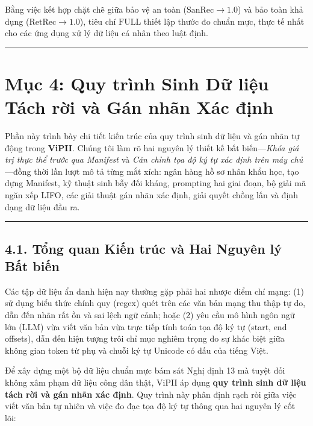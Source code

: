 \documentclass[
  11pt,
  a4paper,
]{article}
\begin{document}
Bằng việc kết hợp chặt chẽ giữa bảo vệ an toàn (\(\text{SanRec} \to 1.0\)) và bảo toàn khả dụng
(\(\text{RetRec} \to 1.0\)), tiêu chí \(\text{FULL}\) thiết lập thước đo chuẩn mực, thực tế nhất cho
các ứng dụng xử lý dữ liệu cá nhân theo luật định.

\begin{center}\rule{0.5\linewidth}{0.5pt}\end{center}

\section{Mục 4: Quy trình Sinh Dữ liệu Tách rời và Gán nhãn Xác
định}\label{mux1ee5c-4-quy-truxecnh-sinh-dux1eef-liux1ec7u-tuxe1ch-rux1eddi-vuxe0-guxe1n-nhuxe3n-xuxe1c-ux111ux1ecbnh}

Phần này trình bày chi tiết kiến trúc của quy trình sinh dữ liệu và gán nhãn tự động trong
\textbf{ViPII}. Chúng tôi làm rõ hai nguyên lý thiết kế bất biến---\emph{Khóa giá trị thực thể trước
qua Manifest} và \emph{Căn chỉnh tọa độ ký tự xác định trên máy chủ}---đồng thời lần lượt mô tả từng
mắt xích: ngân hàng hồ sơ nhân khẩu học, tạo dựng Manifest, kỹ thuật sinh bẫy đối kháng, prompting
hai giai đoạn, bộ giải mã ngăn xếp LIFO, các giải thuật gán nhãn xác định, giải quyết chồng lấn và
định dạng dữ liệu đầu ra.

\begin{center}\rule{0.5\linewidth}{0.5pt}\end{center}

\subsection{4.1. Tổng quan Kiến trúc và Hai Nguyên lý Bất
biến}\label{tux1ed5ng-quan-kiux1ebfn-truxfac-vuxe0-hai-nguyuxean-luxfd-bux1ea5t-biux1ebfn}

Các tập dữ liệu ẩn danh hiện nay thường gặp phải hai nhược điểm chí mạng: (1) sử dụng biểu thức
chính quy (regex) quét trên các văn bản mạng thu thập tự do, dẫn đến nhãn rất ồn và sai lệch ngữ
cảnh; hoặc (2) yêu cầu mô hình ngôn ngữ lớn (LLM) vừa viết văn bản vừa trực tiếp tính toán tọa độ ký
tự (start, end offsets), dẫn đến hiện tượng trôi chỉ mục nghiêm trọng do sự khác biệt giữa không
gian token từ phụ và chuỗi ký tự Unicode có dấu của tiếng Việt.

Để xây dựng một bộ dữ liệu chuẩn mực bám sát Nghị định 13 mà tuyệt đối không xâm phạm dữ liệu công
dân thật, ViPII áp dụng \textbf{quy trình sinh dữ liệu tách rời và gán nhãn xác định}. Quy trình này
phân định rạch ròi giữa việc viết văn bản tự nhiên và việc đo đạc tọa độ ký tự thông qua hai nguyên
lý cốt lõi:
\end{document}
